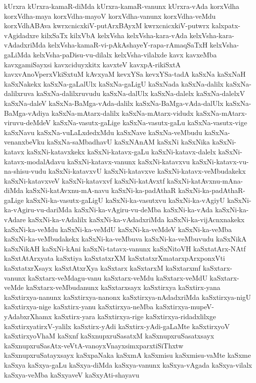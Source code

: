 {kUrxra
kUrxra-kamaR-diMda
kUrxra-kamaR-vanunx
kUrxra-vAda
korxVdha
korxVdha-maya
korxVdha-mayoV
korxVdha-vanunx
korxVdha-veMdu
korxVdhABAva
kwrxcnicxkiV-putArxBAyxM
kwrxcnicxkiV-putwrx
kalxpatx-vAgidadxre
kilxSaTx
kilxVbA
kelxVsha
kelxVsha-kara-vAda
kelxVsha-kara-vAdadxriMda
kelxVsha-kamaR-vi-pAkAshayeY-rapa-rAmaqSaTxH
kelxVsha-gaLiMda
kelxVsha-paDisu-vu-dilalx
kelxVsha-vilalxde
kavx
kavxeMba
kavxgamiSayxsi
kavxciduyxkitx
kavxteV
kavxpA-rikiSxtA
kavxvAnoVperxVkiSxtuM
kAvxyaM
kevxYSa
kevxYSa-tadA
kaSxNa
kaSxNaH
kaSxNakekx
kaSxNa-gaLalUlx
kaSxNa-gaLigU
kaSxNada
kaSxNa-dalilx
kaSxNa-dalilxruva
kaSxNa-dalilxruvudu
kaSxNa-dalUlx
kaSxNa-dalelx
kaSxNa-dalelxV
kaSxNa-daleV
kaSxNa-BaMga-vAda-dalilx
kaSxNa-BaMga-vAda-dalUlx
kaSxNa-BaMga-vAdiya
kaSxNa-mAtarx-dalilx
kaSxNa-mAtarx-vidudx
kaSxNa-mAtarx-viruvu-deMdeV
kaSxNa-vasutx-gaLige
kaSxNa-vasutx-gaLu
kaSxNa-vasutx-vige
kaSxNavu
kaSxNa-vuLaLxdedxMdu
kaSxNave
kaSxNa-veMbudu
kaSxNa-venanxbeVku
kaSxNa-saMbadhavU
kaSxNAnAM
kaSxNi
kaSxNika
kaSxNi-katavx
kaSxNi-katavxkekx
kaSxNi-katavx-gaLu
kaSxNi-katavx-dalelx
kaSxNi-katavx-modalAdavu
kaSxNi-katavx-vanunx
kaSxNi-katavxvu
kaSxNi-katavx-vu-na-shisu-vudu
kaSxNi-katavxvU
kaSxNi-katavxve
kaSxNi-katavx-veMbudakekx
kaSxNi-katavxveV
kaSxNi-katavxvf
kaSxNi-katAvxtf
kaSxNi-katAvxnu-mAna-diMda
kaSxNi-katAvxnu-mA-navu
kaSxNi-ka-padAthaR
kaSxNi-ka-padAthaR-gaLige
kaSxNi-ka-vasutx-gaLigU
kaSxNi-ka-vasutxvu
kaSxNi-ka-vAgiyU
kaSxNi-ka-vAgiru-vu-dariMda
kaSxNi-ka-vAgiru-vu-deMba
kaSxNi-ka-vAda
kaSxNi-ka-vAdare
kaSxNi-ka-vAdalilx
kaSxNi-ka-vAdadxriMda
kaSxNi-ka-vijAcnxnakekx
kaSxNi-ka-veMdu
kaSxNi-ka-veMdU
kaSxNi-ka-veMdeV
kaSxNi-ka-veMba
kaSxNi-ka-veMbudakekx
kaSxNi-ka-veMbuva
kaSxNi-ka-veMbuvudu
kaSxNikA
kaSxNikAH
kaSxNi-kAni
kaSxNi-tatavx-vanunx
kaSxNitoVH
kaSxtatArx-NAtf
kaSxtAtArxyata
kaSxtiya
kaSxtatxrXM
kaSxtatxrXmatarxpArxponxVti
kaSxtatxrXsayx
kaSxtAtxrXya
kaSxtarx
kaSxtarxM
kaSxtarxmf
kaSxtarx-vanunx
kaSxtarx-veMdagu-vanu
kaSxtarx-veMdu
kaSxtarx-veMdU
kaSxtarx-veMde
kaSxtarx-veMbudanunx
kaSxtarxsayx
kaSxtirxya
kaSxtirx-yana
kaSxtirxya-nanunx
kaSxtirxya-nanonx
kaSxtirxya-nAdadxriMda
kaSxtirxya-nigU
kaSxtirxya-nige
kaSxtirx-yanu
kaSxtirxya-neMba
kaSxtirxya-mupeV-yAdabxrXhamx
kaSxtirx-yara
kaSxtirxya-rige
kaSxtirxya-ridadxlilxge
kaSxtirxyatirxV-yalilx
kaSxtirx-yAdi
kaSxtirx-yAdi-gaLaMte
kaSxtirxyoV
kaSxtirxyoVhaM
kaSxnf
kaSxnupxruSasatxM
kaSxnupxruSasatxsayx
kaSxnupxruSasAtx-veVtA-vanoyxVnayxsimxparxtiSiThxtw
kaSxnupxruSatayxsayx
kaSxpaNaka
kaSxmA
kaSxmisu
kaSxmisu-vaMte
kaSxme
kaSxya
kaSxya-gaLu
kaSxya-diMda
kaSxya-vanunx
kaSxya-vAgada
kaSxya-vilalx
kaSxya-veMba
kaSxyaveV
kaSxyAti-shayavu
}
